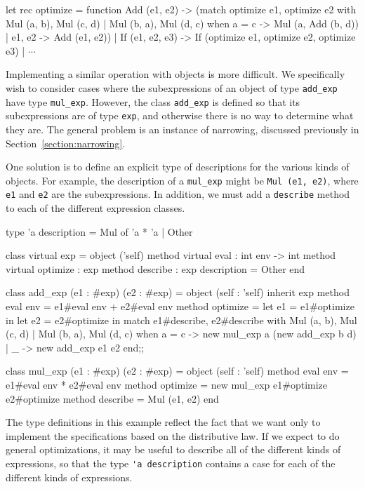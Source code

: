 \begin{ocaml}
let rec optimize = function
   Add (e1, e2) ->
      (match optimize e1, optimize e2 with
          Mul (a, b), Mul (c, d)
        | Mul (b, a), Mul (d, c) when a = c ->
             Mul (a, Add (b, d))
        | e1, e2 ->
             Add (e1, e2))
 | If (e1, e2, e3) ->
     If (optimize e1, optimize e2, optimize e3)
 | $\cdots$
\end{ocaml}
%
Implementing a similar operation with objects is more difficult.  We
specifically wish to consider cases where the subexpressions of an
object of type \hbox{\lstinline$add_exp$} have type \hbox{\lstinline$mul_exp$}.
However, the class \hbox{\lstinline$add_exp$} is defined so that its
subexpressions are of type \hbox{\lstinline$exp$}, and otherwise there is no
way to determine what they are.  The general problem is an instance of
narrowing, discussed previously in
Section~\ref{section:narrowing}.

One solution is to define an explicit type of descriptions for the
various kinds of objects.  For example, the description of
a \hbox{\lstinline$mul_exp$} might be \hbox{\lstinline$Mul (e1, e2)$},
where \hbox{\lstinline$e1$} and \hbox{\lstinline$e2$} are the subexpressions.  In
addition, we must add a \hbox{\lstinline$describe$} method to each of the
different expression classes.

\begin{ocaml}
type 'a description =
   Mul of 'a * 'a
 | Other

class virtual exp =
  object ('self)
    method virtual eval : int env -> int
    method virtual optimize : exp
    method describe : exp description = Other
  end

class add_exp (e1 : #exp) (e2 : #exp) =
  object (self : 'self)
    inherit exp
    method eval env = e1#eval env + e2#eval env
    method optimize =
      let e1 = e1#optimize in
      let e2 = e2#optimize in
        match e1#describe, e2#describe with
           Mul (a, b), Mul (c, d)
         | Mul (b, a), Mul (d, c) when a = c ->
             new mul_exp a (new add_exp b d)
         | _ ->
             new add_exp e1 e2
  end;;

class mul_exp (e1 : #exp) (e2 : #exp) =
  object (self : 'self)
    method eval env = e1#eval env * e2#eval env
    method optimize = new mul_exp e1#optimize e2#optimize
    method describe = Mul (e1, e2)
  end
\end{ocaml}
%
The type definitions in this example reflect the fact that we want
only to implement the specifications based on the distributive law.
If we expect to do general optimizations, it may be useful to describe
all of the different kinds of expressions, so that the
type \hbox{\lstinline$'a description$} contains a case for each of the
different kinds of expressions.

